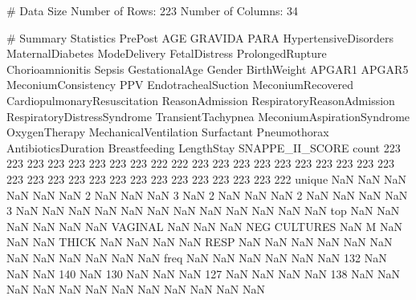 \documentclass[11pt]{article}
\begin{document}
\begin{codeoutput}
\# Data Size
Number of Rows: 223
Number of Columns: 34

\# Summary Statistics
        PrePost   AGE  GRAVIDA   PARA  HypertensiveDisorders  MaternalDiabetes ModeDelivery  FetalDistress  ProlongedRupture  Chorioamnionitis        Sepsis  GestationalAge Gender  BirthWeight  APGAR1  APGAR5 MeconiumConsistency   PPV  EndotrachealSuction  MeconiumRecovered  CardiopulmonaryResuscitation ReasonAdmission  RespiratoryReasonAdmission  RespiratoryDistressSyndrome  TransientTachypnea  MeconiumAspirationSyndrome  OxygenTherapy  MechanicalVentilation  Surfactant  Pneumothorax  AntibioticsDuration  Breastfeeding  LengthStay  SNAPPE\_II\_SCORE
count       223   223      223    223                    223               223          223            223               222               222           223             223    223          223     223     223                 223   223                  223                223                           223             223                         223                          223                 223                         223            223                    223         223           223                  223            223         223              222
unique      NaN   NaN      NaN    NaN                    NaN               NaN            2            NaN               NaN               NaN             3             NaN      2          NaN     NaN     NaN                   2   NaN                  NaN                NaN                           NaN               3                         NaN                          NaN                 NaN                         NaN            NaN                    NaN         NaN           NaN                  NaN            NaN         NaN              NaN
top         NaN   NaN      NaN    NaN                    NaN               NaN      VAGINAL            NaN               NaN               NaN  NEG CULTURES             NaN      M          NaN     NaN     NaN               THICK   NaN                  NaN                NaN                           NaN            RESP                         NaN                          NaN                 NaN                         NaN            NaN                    NaN         NaN           NaN                  NaN            NaN         NaN              NaN
freq        NaN   NaN      NaN    NaN                    NaN               NaN          132            NaN               NaN               NaN           140             NaN    130          NaN     NaN     NaN                 127   NaN                  NaN                NaN                           NaN             138                         NaN                          NaN                 NaN                         NaN            NaN                    NaN         NaN           NaN                  NaN            NaN         NaN              NaN

\end{codeoutput}
\end{document}

